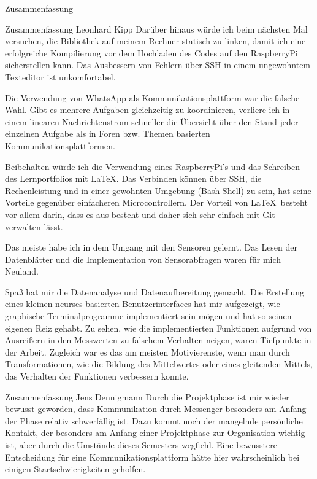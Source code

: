 \documentclass[12pt]{report}
\begin{document}
\begin{section}{Zusammenfassung}
\begin{subsection}{Zusammenfassung Leonhard Kipp}
    Darüber hinaus würde ich beim nächsten Mal versuchen, die \wiringPi{}
    Bibliothek auf meinem Rechner statisch zu linken, damit ich eine
    erfolgreiche Kompilierung vor dem Hochladen des Codes auf den RaspberryPi
    sicherstellen kann. Das Ausbessern von Fehlern über SSH in einem ungewohntem
    Texteditor ist unkomfortabel.

    Die Verwendung von WhatsApp als Kommunikationsplattform war die falsche
    Wahl. Gibt es mehrere Aufgaben gleichzeitig zu koordinieren, verliere ich in
    einem linearen Nachrichtenstrom schneller die Übersicht über den Stand jeder
    einzelnen Aufgabe als in Foren bzw. Themen basierten Kommunikationsplattformen.

    Beibehalten würde ich die Verwendung eines RaspberryPi's und das Schreiben
    des Lernportfolios mit \LaTeX. Das Verbinden
    können über SSH, die Rechenleistung und in einer gewohnten Umgebung
    (Bash-Shell) zu sein, hat seine Vorteile gegenüber einfacheren Microcontrollern.
    Der Vorteil von \LaTeX\ besteht vor allem darin, dass es aus 
    besteht und daher sich sehr einfach mit Git verwalten lässt.

    Das meiste habe ich in dem Umgang mit den Sensoren gelernt. Das Lesen der
    Datenblätter und die Implementation von Sensorabfragen waren für mich Neuland.

    Spaß hat mir die Datenanalyse und Datenaufbereitung gemacht. Die Erstellung
    eines kleinen ncurses basierten Benutzerinterfaces hat mir aufgezeigt, wie
    graphische Terminalprogramme implementiert sein mögen und hat so seinen
    eigenen Reiz gehabt. Zu sehen, wie die implementierten Funktionen
    aufgrund von Ausreißern in den Messwerten zu falschem Verhalten neigen,
    waren Tiefpunkte in der Arbeit. Zugleich war es das am meisten
    Motivierenste, wenn man durch Transformationen, wie die Bildung des
    Mittelwertes oder eines gleitenden Mittels, das Verhalten der Funktionen
    verbessern konnte.
       
  \end{subsection}
  \begin{subsection}{Zusammenfassung Jens Dennigmann}
  Durch die Projektphase ist mir wieder bewusst geworden, dass Kommunikation durch 
  Messenger besonders am Anfang der Phase relativ schwerfällig ist. Dazu kommt noch der 
  mangelnde persönliche Kontakt, der besonders am Anfang einer Projektphase zur Organisation 
  wichtig ist, aber durch die Umstände dieses Semesters wegfiehl. Eine bewusstere 
  Entscheidung für eine Kommunikationsplattform hätte hier wahrscheinlich bei einigen 
  Startschwierigkeiten geholfen.
  

\end{subsection}
\end{section}
\end{document}
